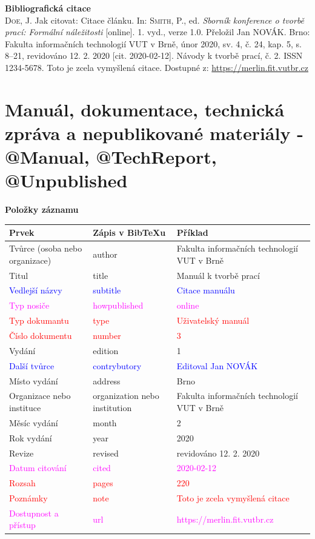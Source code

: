 \bigskip

\noindent \textbf{Bibliografická citace}\\
\textsc{Doe}, J. Jak citovat: Citace článku.
In: \textsc{Smith}, P., ed. \textit{Sborník konference o tvorbě prací: Formální náležitosti} [online]. 1. vyd., verze 1.0. Přeložil Jan NOVÁK. Brno: Fakulta informačních technologií VUT v Brně, únor 2020, sv. 4, č. 24, kap. 5, s. 8–21, revidováno 12. 2. 2020 [cit. 2020-02-12]. Návody k tvorbě prací, č. 2. ISSN 1234-5678. Toto je zcela vymyšlená citace. Dostupné z: \url{https://merlin.fit.vutbr.cz}
\newpage
\section*{Manuál, dokumentace, technická zpráva a nepublikované materiály - @Manual, @TechReport, @Unpublished}
\label{pr-manual}
\noindent \textbf{Položky záznamu}

\medskip

\begin{tabularx}{\linewidth}{X X X}
    Prvek & Zápis v BibTeXu & Příklad\\\hline
    Tvůrce (osoba nebo organizace) & author & Fakulta informačních technologií VUT v Brně\\
    Titul & title & Manuál k tvorbě prací\\
    \textcolor{blue}{Vedlejší názvy} & \textcolor{blue}{subtitle} & \textcolor{blue}{Citace manuálu}\\
    \textcolor{magenta}{Typ nosiče} & \textcolor{magenta}{howpublished} & \textcolor{magenta}{online}\\
    \textcolor{red}{Typ dokumantu} & \textcolor{red}{type} & \textcolor{red}{Uživatelský manuál}\\
    \textcolor{red}{Číslo dokumentu} & \textcolor{red}{number} & \textcolor{red}{3}\\
    Vydání & edition & 1\\
    \textcolor{blue}{Další tvůrce} & \textcolor{blue}{contrybutory} & \textcolor{blue}{Editoval Jan NOVÁK}\\
    Místo vydání & address & Brno\\
    Organizace nebo instituce & organization nebo institution & Fakulta informačních technologií VUT v Brně\\
    Měsíc vydání & month & 2\\
    Rok vydání & year & 2020\\
    Revize & revised & revidováno 12. 2. 2020\\
    \textcolor{magenta}{Datum citování} & \textcolor{magenta}{cited} & \textcolor{magenta}{2020-02-12}\\
    \textcolor{red}{Rozsah} & \textcolor{red}{pages} & \textcolor{red}{220}\\   
    \textcolor{red}{Poznámky} & \textcolor{red}{note} & \textcolor{red}{Toto je zcela vymyšlená citace}\\
    \textcolor{magenta}{Dostupnost a přístup} & \textcolor{magenta}{url} & \textcolor{magenta}{https://merlin.fit.vutbr.cz}\\
\end{tabularx}

